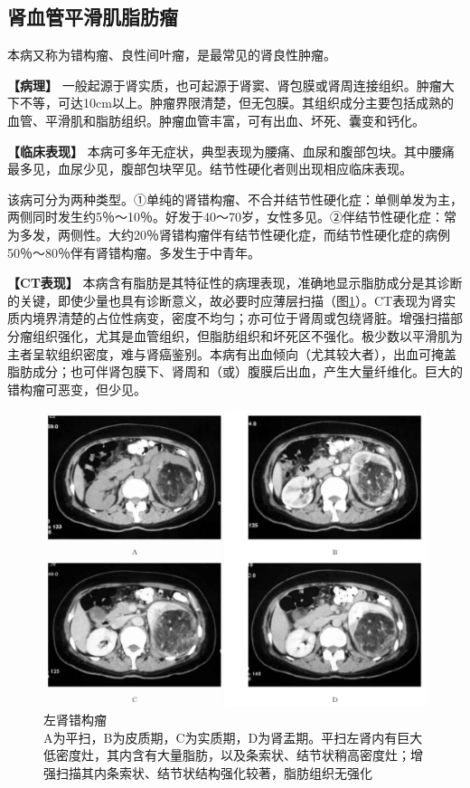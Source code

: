 \subsection{肾血管平滑肌脂肪瘤}

本病又称为错构瘤、良性间叶瘤，是最常见的肾良性肿瘤。

\textbf{【病理】}
一般起源于肾实质，也可起源于肾窦、肾包膜或肾周连接组织。肿瘤大下不等，可达10cm以上。肿瘤界限清楚，但无包膜。其组织成分主要包括成熟的血管、平滑肌和脂肪组织。肿瘤血管丰富，可有出血、坏死、囊变和钙化。

\textbf{【临床表现】}
本病可多年无症状，典型表现为腰痛、血尿和腹部包块。其中腰痛最多见，血尿少见，腹部包块罕见。结节性硬化者则出现相应临床表现。

该病可分为两种类型。①单纯的肾错构瘤、不合并结节性硬化症：单侧单发为主，两侧同时发生约5％～10％。好发于40～70岁，女性多见。②伴结节性硬化症：常为多发，两侧性。大约20％肾错构瘤伴有结节性硬化症，而结节性硬化症的病例50％～80％伴有肾错构瘤。多发生于中青年。

\textbf{【CT表现】}
本病含有脂肪是其特征性的病理表现，准确地显示脂肪成分是其诊断的关键，即使少量也具有诊断意义，故必要时应薄层扫描（图\ref{fig15-19}）。CT表现为肾实质内境界清楚的占位性病变，密度不均匀；亦可位于肾周或包绕肾脏。增强扫描部分瘤组织强化，尤其是血管组织，但脂肪组织和坏死区不强化。极少数以平滑肌为主者呈软组织密度，难与肾癌鉴别。本病有出血倾向（尤其较大者），出血可掩盖脂肪成分；也可伴肾包膜下、肾周和（或）腹膜后出血，产生大量纤维化。巨大的错构瘤可恶变，但少见。

\begin{figure}[!htbp]
 \centering
 \includegraphics[width=.7\textwidth,height=\textheight,keepaspectratio]{./images/Image00336.jpg}
 \captionsetup{justification=centering}
 \caption{左肾错构瘤\\{\small A为平扫，B为皮质期，C为实质期，D为肾盂期。平扫左肾内有巨大低密度灶，其内含有大量脂肪，以及条索状、结节状稍高密度灶；增强扫描其内条索状、结节状结构强化较著，脂肪组织无强化}}
 \label{fig15-19}
  \end{figure} 

